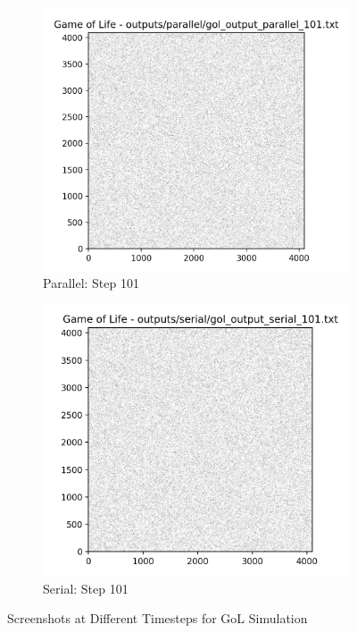 \documentclass[a4paper,10pt]{article}
\begin{document}
\begin{figure}
\begin{subfigure}{0.4\textwidth}
    \includegraphics[width=\textwidth]{img/bonus/parallel_101.png}
    \caption{Parallel: Step 101}
\end{subfigure}
\hfill
\begin{subfigure}{0.4\textwidth}
    \includegraphics[width=\textwidth]{img/bonus/serial_101.png}
    \caption{Serial: Step 101}
\end{subfigure}
        
\caption{Screenshots at Different Timesteps for GoL Simulation}
\label{fig:bonus_vis}
\end{figure}
\end{document}
